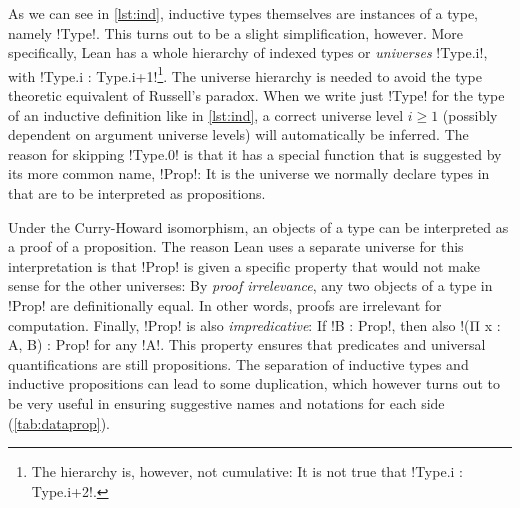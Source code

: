 As we can see in \autoref{lst:ind}, inductive types themselves are instances of
a type, namely \lean!Type!. This turns out to be a slight simplification,
however. More specifically, Lean has a whole hierarchy of indexed types
or \emph{universes} \lean!Type.{i}!, with \lean!Type.{i} :
Type.{i+1}!\footnote{The hierarchy is, however, not cumulative: It is not true
  that \lean!Type.{i} : Type.{i+2}!.}. The universe hierarchy is needed to avoid
the type theoretic equivalent of Russell's paradox. When we write just
\lean!Type! for the type of an inductive definition like in \autoref{lst:ind},
a correct universe level $i \ge 1$
(possibly dependent on argument universe levels) will automatically be inferred.
The reason for skipping \lean!Type.{0}! is that it has a special function that
is suggested by its more common name, \lean!Prop!: It is the universe we normally
declare types in that are to be interpreted as propositions.

Under the Curry-Howard isomorphism, an objects of a type can be interpreted as
a proof of a proposition. The reason Lean uses a separate universe for this
interpretation is that \lean!Prop! is given a specific property that would not
make sense for the other universes: By \emph{proof irrelevance}, any two
objects of a type in \lean!Prop! are definitionally equal. In other words,
proofs are irrelevant for computation. Finally, \lean!Prop! is also
\emph{impredicative}: If \lean!B : Prop!, then also \lean!(Π x : A, B) : Prop!
for any \lean!A!. This property ensures that predicates and universal
quantifications are still propositions.
The separation of inductive types and inductive propositions can lead to some duplication, which
however turns out to be very useful in ensuring suggestive names and notations
for each side (\autoref{tab:dataprop}).

